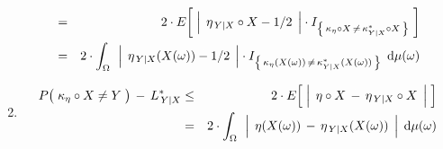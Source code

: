 \begin{theorem}
\begin{enumerate}
\begin{eqnarray*}
	& = &
		2 \cdot E\!\left[\;
			\left\vert\;\, \eta_{\,Y\vert X} \circ X \overset{{\color{white}.}}{-} 1/2 \;\,\right\vert
			\cdot
			I_{\left\{\,\kappa_{\eta} \circ X \,\neq\, \kappa^{*}_{Y \vert X} \circ X\,\right\}}
			\;\right]
	\\
	& = &
		2 \cdot \int_{\Omega}\,\;
			\left\vert\;\, \eta_{\,Y\vert X}(X(\omega)) \overset{{\color{white}.}}{-} 1/2 \;\,\right\vert
			\cdot
			I_{\left\{\,\kappa_{\eta}(X(\omega)) \,\neq\, \kappa^{*}_{Y \vert X}(X(\omega))\,\right\}}
			\,\;\d\mu(\omega)
	\end{eqnarray*}
\item
	\begin{eqnarray*}
	P\!\left(\;\kappa_{\eta} \overset{{\color{white}.}}{\circ} X \neq Y \;\right) \,-\, L^{*}_{\,Y \vert X}
	& \leq &
		2 \cdot E\!\left[\;
			\left\vert\;\, \eta \circ X \,\overset{{\color{white}.}}{-}\, \eta_{\,Y\vert X} \circ X \;\,\right\vert
			\;\right]
	\\
	& = &
		2 \cdot \int_{\Omega}\,\;
			\left\vert\;\, \eta(X(\omega)) \,\overset{{\color{white}.}}{-}\, \eta_{\,Y\vert X}(X(\omega)) \;\,\right\vert
			\;\d\mu(\omega)
	\end{eqnarray*}
\end{enumerate}
\end{theorem}
\proof
